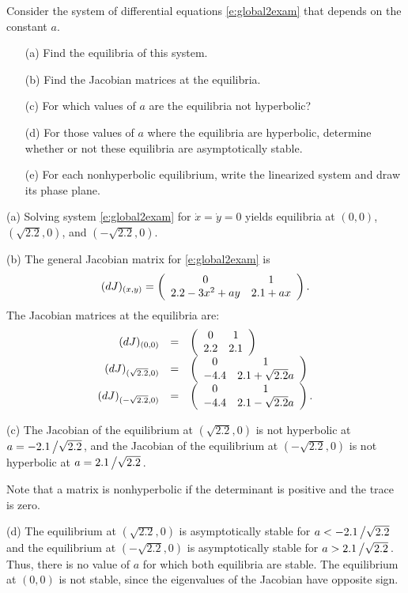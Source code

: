 \documentclass{ximera}
\begin{document}
\begin{exercise} \label{c8.2.7}
Consider the system of differential equations \eqref{e:global2exam}
that depends on the constant $a$.  
\begin{itemize}
\item[(a)]	Find the equilibria of this system.
\item[(b)]	Find the Jacobian matrices at the equilibria.  
\item[(c)]	For which values of $a$ are the equilibria not
		hyperbolic?
\item[(d)]	For those values of $a$ where the equilibria are 
		hyperbolic, determine whether or not these equilibria 
		are asymptotically stable.
\item[(e)]	For each nonhyperbolic equilibrium, write the linearized 
		system and draw its phase plane.
\end{itemize}

\begin{solution}

(a) Solving system \eqref{e:global2exam} for $\dot{x} = \dot{y} = 0$
yields equilibria at $(0,0)$, $(\sqrt{2.2},0)$, and $(-\sqrt{2.2},0)$.

(b) The general Jacobian matrix for \eqref{e:global2exam} is
\[
(dJ)_{(x,y)} = \left(\begin{array}{cc} 0 & 1\\ 2.2 - 3x^2 + ay &2.1 + ax\end{array}\right).
\]
The Jacobian matrices at the equilibria are:
\[ \begin{array}{rcl}
(dJ)_{(0,0)} & = & \left(\begin{array}{cc} 0 & 1\\ 2.2 &2.1\end{array}\right) \\
(dJ)_{(\sqrt{2.2},0)} & = & \left(\begin{array}{cc} 0 & 1\\ -4.4 &2.1 + \sqrt{2.2}a\end{array}\right) \\
(dJ)_{(-\sqrt{2.2},0)} & = & \left(\begin{array}{cc} 0 & 1\\ -4.4 &2.1 - \sqrt{2.2}a\end{array}\right). \\
\end{array}
\]

(c) \ans The Jacobian of the equilibrium at $(\sqrt{2.2},0)$ is not
hyperbolic at $a = -2.1\left/\sqrt{2.2}\right.$, and the Jacobian of the
equilibrium at $(-\sqrt{2.2},0)$ is not hyperbolic at
$a = 2.1\left/\sqrt{2.2}\right.$.

\soln Note that a matrix is nonhyperbolic if the determinant is positive
and the trace is zero.

(d) \ans The equilibrium at $(\sqrt{2.2},0)$ is asymptotically stable for
$a < -2.1\left/\sqrt{2.2}\right.$ and the equilibrium at
$(-\sqrt{2.2},0)$ is asymptotically stable for
$a > 2.1\left/\sqrt{2.2}\right.$.  Thus, there is no value of $a$ for which
both equilibria are stable.  The equilibrium at $(0,0)$ is not stable,
since the eigenvalues of the Jacobian have opposite sign.


\end{solution}
\end{exercise}
\end{document}
